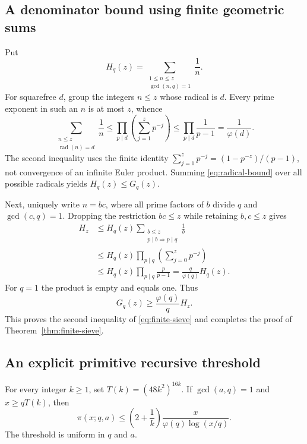 \subsection{A denominator bound using finite geometric sums}

Put
\[
 H_q(z)=\sum_{\substack{1\leq n\leq z\\\gcd(n,q)=1}}\frac1n.
\]
For squarefree $d$, group the integers $n\leq z$ whose radical is $d$.
Every prime exponent in such an $n$ is at most $z$, whence
\begin{equation}
 \sum_{\substack{n\leq z\\\operatorname{rad}(n)=d}}\frac1n
 \leq\prod_{p\mid d}\left(\sum_{j=1}^{z}p^{-j}\right)
 \leq\prod_{p\mid d}\frac1{p-1}
 =\frac1{\varphi(d)}.
 \label{eq:radical-bound}
\end{equation}
The second inequality uses the finite identity
$\sum_{j=1}^{z}p^{-j}=(1-p^{-z})/(p-1)$, not convergence of an
infinite Euler product.  Summing \eqref{eq:radical-bound} over all
possible radicals yields $H_q(z)\leq G_q(z)$.

Next, uniquely write $n=bc$, where all prime factors of $b$ divide $q$
and $\gcd(c,q)=1$.  Dropping the restriction $bc\leq z$ while retaining
$b,c\leq z$ gives
\begin{align*}
 H_z
 &\leq H_q(z)
       \sum_{\substack{b\leq z\\p\mid b\Rightarrow p\mid q}}\frac1b\\
 &\leq H_q(z)\prod_{p\mid q}\left(\sum_{j=0}^{z}p^{-j}\right)\\
 &\leq H_q(z)\prod_{p\mid q}\frac p{p-1}
  =\frac q{\varphi(q)}H_q(z).
\end{align*}
For $q=1$ the product is empty and equals one.  Thus
\begin{equation}
 G_q(z)\geq \frac{\varphi(q)}qH_z.
 \label{eq:sieve-denominator}
\end{equation}
This proves the second inequality of \eqref{eq:finite-sieve} and
completes the proof of Theorem~\ref{thm:finite-sieve}.

\subsection{An explicit primitive recursive threshold}

\begin{theorem}
\label{thm:asymptotic-bt}
For every integer $k\geq1$, set $T(k)=(48k^2)^{16k}$.  If
$\gcd(a,q)=1$ and $x\geq qT(k)$, then
\begin{equation}
 \pi(x;q,a)\leq
 \left(2+\frac1k\right)\frac{x}{\varphi(q)\log(x/q)}.
 \label{eq:asymptotic-bt}
\end{equation}
The threshold is uniform in $q$ and $a$.
\end{theorem}

